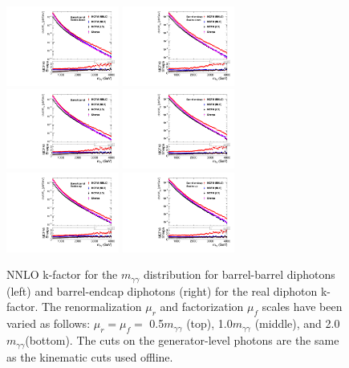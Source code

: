 \begin{figure}[tbp!]
\begin{center}
\includegraphics[angle=0,width=0.33\textwidth]{fig/BB_hist1_R0p5F0p5_125GeV_NNPDF.pdf}
\includegraphics[angle=0,width=0.33\textwidth]{fig/BE_hist1_R0p5F0p5_125GeV_NNPDF.pdf}
\includegraphics[angle=0,width=0.33\textwidth]{fig/BB_hist1_R1F1_125GeV_NNPDF.pdf}
\includegraphics[angle=0,width=0.33\textwidth]{fig/BE_hist1_R1F1_125GeV_NNPDF.pdf}
\includegraphics[angle=0,width=0.33\textwidth]{fig/BB_hist1_R2F2_125GeV_NNPDF.pdf}
\includegraphics[angle=0,width=0.33\textwidth]{fig/BE_hist1_R2F2_125GeV_NNPDF.pdf}
\end{center}
\caption{NNLO k-factor for the $m_{\gamma\gamma}$ distribution for barrel-barrel
  diphotons (left) and barrel-endcap diphotons (right) for the real diphoton k-factor. The
  renormalization $\mu_{r}$ and factorization $\mu_{f}$ scales have been varied as follows: $\mu_{r}=\mu_{f}=$ 0.5$m_{\gamma\gamma}$ (top), 1.0$m_{\gamma\gamma}$ (middle), and 2.0$m_{\gamma\gamma}$(bottom). The cuts on the generator-level photons are the same as the kinematic cuts used offline.}
\label{fig:kfactor_mgg}
\end{figure}

